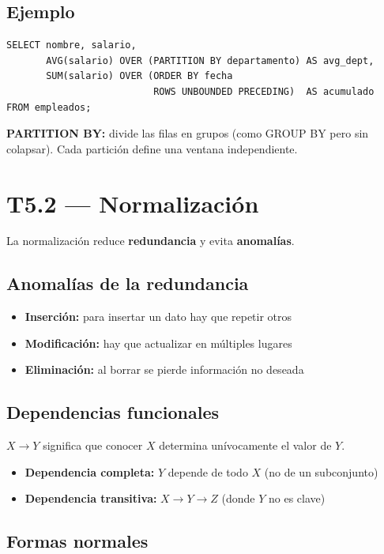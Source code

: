 \documentclass[12pt, a4paper]{article}
\begin{document}
\subsection{Ejemplo}
\begin{lstlisting}
SELECT nombre, salario,
       AVG(salario) OVER (PARTITION BY departamento) AS avg_dept,
       SUM(salario) OVER (ORDER BY fecha
                          ROWS UNBOUNDED PRECEDING)  AS acumulado
FROM empleados;
\end{lstlisting}

\textbf{PARTITION BY:} divide las filas en grupos (como GROUP BY pero sin colapsar). Cada partición define una ventana independiente.

\section{T5.2 — Normalización}

La normalización reduce \textbf{redundancia} y evita \textbf{anomalías}.

\subsection{Anomalías de la redundancia}
\begin{itemize}
  \item \textbf{Inserción:} para insertar un dato hay que repetir otros
  \item \textbf{Modificación:} hay que actualizar en múltiples lugares
  \item \textbf{Eliminación:} al borrar se pierde información no deseada
\end{itemize}

\subsection{Dependencias funcionales}
$X \rightarrow Y$ significa que conocer $X$ determina unívocamente el valor de $Y$.
\begin{itemize}
  \item \textbf{Dependencia completa:} $Y$ depende de todo $X$ (no de un subconjunto)
  \item \textbf{Dependencia transitiva:} $X \rightarrow Y \rightarrow Z$ (donde $Y$ no es clave)
\end{itemize}

\subsection{Formas normales}
\end{document}
